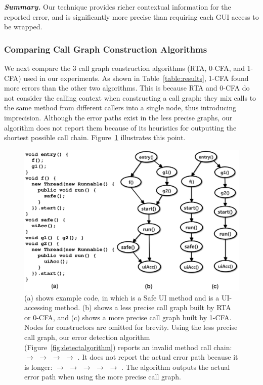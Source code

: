 \vspace{1mm}

\noindent \textbf{\textit{Summary.}} Our technique provides
richer contextual information for the reported error, and 
is significantly more precise than requiring each GUI
access to be wrapped.

\subsubsection{Comparing Call Graph Construction Algorithms}
\label{sec:reflectionaware}

We next compare the 3 call graph construction algorithms (RTA, 0-CFA, and 1-CFA)
used in our experiments. As shown in Table~\ref{table:results},  1-CFA found
more errors than the other two algorithms. This
is because RTA and 0-CFA do not consider the calling context when
constructing a call graph:  they
mix calls to the same method from different callers into a single node, thus
introducing imprecision. Although the error paths exist in
the less precise graphs, our algorithm does not report them because of its heuristics
for outputting the shortest possible call chain. Figure~\ref{fig:ex} illustrates this point.

\begin{figure}[t]
  \centering
  \includegraphics[scale=0.44]{cgexample}
  \vspace*{-5.0ex}\caption {{\label{fig:ex} (a) shows example code, in which
 is a Safe UI method and  is a UI-accessing method.
(b) shows a less precise call graph built by RTA or 0-CFA, and (c) shows a more
precise call graph built by 1-CFA\@. Nodes for constructors are omitted for brevity.
\newline
Using the less precise call graph, our error
detection algorithm (Figure~\ref{fig:detectalgorithm}) reports an invalid method
call chain: 
$\rightarrow$  $\rightarrow$  $\rightarrow$ 
$\rightarrow$ . It does not report
the actual error path because it is longer:  $\rightarrow$  $\rightarrow$
 $\rightarrow$  $\rightarrow$  $\rightarrow$ .
The algorithm outputs the actual error path when using the more precise call graph.
}}
\end{figure}



